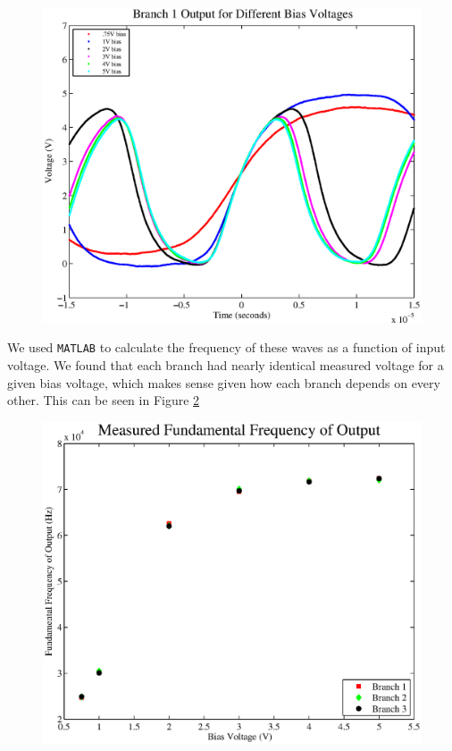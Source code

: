 \documentclass{article}
\begin{document}
\begin{figure}[H]
\centering
\includegraphics[scale=.6]{b1_out.eps}
\caption{}
\label{branch}
\end{figure}

We used \texttt{MATLAB} to calculate the frequency of these waves as a function of input voltage.  We found that each branch had nearly identical measured voltage for a given bias voltage, which makes sense given how each branch depends on every other.  This can be seen in Figure \ref{freqs}

\begin{figure}[H]
\centering
\includegraphics[scale=.5]{freqs.eps}
\caption{}
\label{freqs}
\end{figure}
\end{document}
